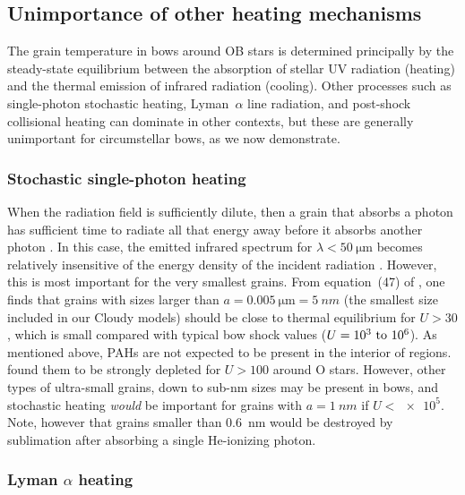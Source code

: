 
\subsection{Unimportance of other heating mechanisms}
\label{sec:unimp-other-heat}
The grain temperature in bows around OB stars is determined
principally by the steady-state equilibrium between the absorption of
stellar UV radiation (heating) and the thermal emission of infrared
radiation (cooling).  Other processes such as single-photon stochastic
heating, Lyman~\(\alpha\) line radiation, and post-shock collisional
heating can dominate in other contexts, but these are generally
unimportant for circumstellar bows, as we now demonstrate.

\subsubsection{Stochastic single-photon heating}

When the radiation field is sufficiently dilute, then a grain that
absorbs a photon has sufficient time to radiate all that energy away
before it absorbs another photon \citep{Duley:1973a}.  In this case,
the emitted infrared spectrum for \(\lambda < \SI{50}{\um}\) becomes
relatively insensitive of the energy density of the incident radiation
\citep{Draine:2001a}.  However, this is most important for the very
smallest grains.  From equation~(47) of \citet{Draine:2001a}, one
finds that grains with sizes larger than
\(a = \SI{0.005}{\um} = \SI{5}{nm}\) (the smallest size included in
our Cloudy models) should be close to thermal equilibrium for
\(U > 30\), which is small compared with typical bow shock values
(\(U = \text{\numrange{e3}{e6}}\)).  As mentioned above, PAHs are not
expected to be present in the interior of \hii{} regions.
\citealp{Desert:1990a} found them to be strongly depleted for
\(U > 100\) around O stars.  However, other types of ultra-small
grains, down to sub-nm sizes \citep{Xie:2018a} may be present in bows,
and stochastic heating \emph{would} be important for grains with
\(a = \SI{1}{nm}\) if \(U < \num{e5}\).  Note, however that grains
smaller than \SI{0.6}{nm} would be destroyed by sublimation after
absorbing a single He-ionizing photon.


\subsubsection{Lyman \(\alpha\) heating}

